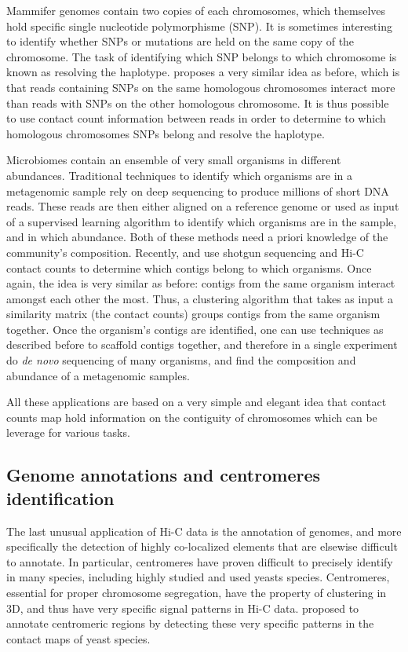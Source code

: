 Mammifer genomes contain two copies of each chromosomes, which themselves hold
specific single nucleotide polymorphisme (SNP). It is sometimes interesting to
identify whether SNPs or mutations are held on the same copy of the
chromosome. The task of identifying which SNP belongs to which chromosome is
known as resolving the haplotype. \citet{selvaraj:whole-genome}
proposes a very similar idea as
before, which is that reads containing SNPs on the same homologous chromosomes
interact more than reads with SNPs on the other homologous chromosome.
It is thus
possible to use contact count information between reads in order to determine
to which homologous chromosomes SNPs belong and resolve the haplotype.

Microbiomes contain an ensemble of very small organisms in different
abundances. Traditional techniques to identify which organisms are in a
metagenomic sample rely on deep sequencing to produce millions of short DNA
reads. These reads are then either aligned on a reference genome or used as
input of a supervised learning algorithm to identify which organisms
are in the sample, and in which abundance. Both of these
methods need a priori knowledge of the community's composition. Recently,
\citet{burton:species-level} and \citet{marbouty:metagenomic} use shotgun
sequencing and Hi-C contact counts to determine which contigs belong to which
organisms. Once again, the idea is very similar as before: contigs from the
same organism interact amongst each other the most. Thus, a clustering
algorithm that takes as input a similarity matrix (the contact counts) groups
contigs from the same organism together. Once the organism's contigs are
identified, one can use techniques as described before to scaffold contigs
together, and therefore in a single experiment do \textit{de novo} sequencing
of many organisms, and find the composition and abundance of a metagenomic
samples.

All these applications are based on a very simple and elegant idea that
contact counts map hold information on the contiguity of chromosomes which can
be leverage for various tasks.

\subsection{Genome annotations and centromeres identification}

The last unusual application of Hi-C data is the annotation of genomes, and
more specifically the detection of highly co-localized elements that are
elsewise difficult to annotate. In particular, centromeres have proven
difficult to precisely identify in many species, including highly studied and
used yeasts species. Centromeres, essential for proper chromosome segregation,
have the property of clustering in 3D, and thus have very specific signal
patterns in Hi-C data. \citet{marie-nelly:filling} proposed to annotate
centromeric regions by detecting these very specific patterns in the contact
maps of yeast species.

